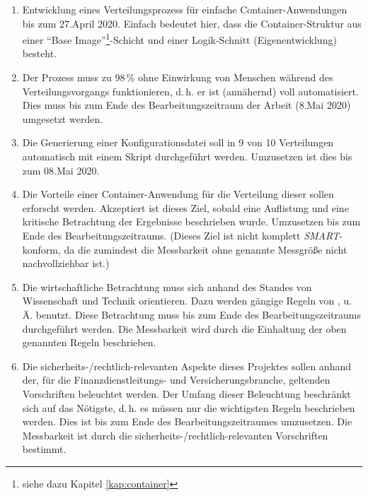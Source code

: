 \begin{enumerate}
	\item Entwicklung eines Verteilungsprozess für einfache Container-Anwendungen bis zum 27.April 2020. Einfach bedeutet hier, dass die Container-Struktur aus einer \enquote{Base Image}\footnote{siehe dazu Kapitel \vref{kap:container}}-Schicht und einer Logik-Schnitt (Eigenentwicklung) besteht.
	\item Der Prozess muss zu 98\,\% ohne Einwirkung von Menschen während des Verteilungsvorgangs funktionieren, d.\,h. er ist (annähernd) voll automatisiert. Dies muss bis zum Ende des Bearbeitungszeitraum der Arbeit (8.Mai 2020) umgesetzt werden.
	\item Die Generierung einer Konfigurationsdatei soll in 9 von 10 Verteilungen automatisch mit einem Skript durchgeführt werden. Umzusetzen ist dies bis zum 08.Mai 2020.
	\item Die Vorteile einer Container-Anwendung für die Verteilung dieser sollen erforscht werden. Akzeptiert ist dieses Ziel, sobald eine Auflistung und eine kritische Betrachtung der Ergebnisse beschrieben wurde. Umzusetzen bis zum Ende des Bearbeitungszeitraums. (Dieses Ziel ist nicht komplett \textit{SMART}-konform, da die zumindest die Messbarkeit ohne genannte Messgröße nicht nachvollziehbar ist.)
	\item Die wirtschaftliche Betrachtung muss sich anhand des Standes von Wissenschaft und Technik orientieren. Dazu werden gängige Regeln von \cite{herman_is_2009}, \cite{brugger_it_2009} u.\,Ä. benutzt. Diese Betrachtung muss bis zum Ende des Bearbeitungszeitraums durchgeführt werden. Die Messbarkeit wird durch die Einhaltung der oben genannten Regeln beschrieben.
	\item Die sicherheits-/rechtlich-relevanten Aspekte dieses Projektes sollen anhand der, für die Finanzdienstleitungs- und Versicherungsbranche, geltenden Vorschriften beleuchtet werden. Der Umfang dieser Beleuchtung beschränkt sich auf das Nötigste, d.\,h. es müssen nur die wichtigsten Regeln beschrieben werden. Dies ist bis zum Ende des Bearbeitungszeitraumes umzusetzen. Die Messbarkeit ist durch die sicherheits-/rechtlich-relevanten Vorschriften bestimmt.
\end{enumerate}

